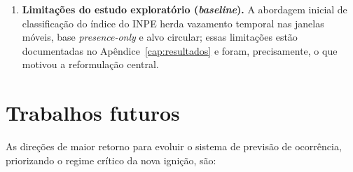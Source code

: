 \documentclass[tcc2]{uftex}
\begin{document}
\begin{enumerate}
  \item \textbf{Limitações do estudo exploratório (\emph{baseline}).} A abordagem inicial de classificação do índice do INPE herda vazamento temporal nas janelas móveis, base \emph{presence-only} e alvo circular; essas limitações estão documentadas no Apêndice~\ref{cap:resultados} e foram, precisamente, o que motivou a reformulação central.
\end{enumerate}

\section{Trabalhos futuros}
\label{sec:conclusao_futuros}

As direções de maior retorno para evoluir o sistema de previsão de ocorrência, priorizando o regime crítico da nova ignição, são:
\end{document}
